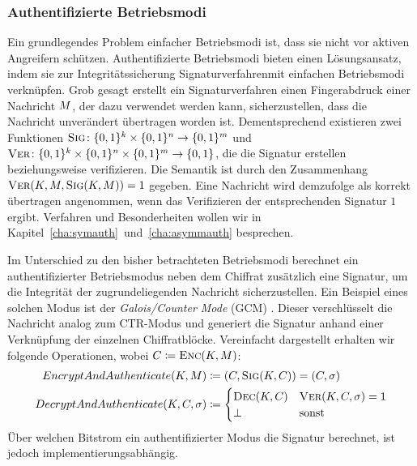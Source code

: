 \subsubsection{Authentifizierte Betriebsmodi}\label{sssec:gcm} 
Ein grundlegendes Problem einfacher Betriebsmodi ist, dass sie nicht vor
aktiven Angreifern schützen. Authentifizierte
Betriebsmodi bieten
einen Lösungsansatz, indem sie zur Integritätssicherung
Signaturverfahren\indexSig mit einfachen Betriebsmodi verknüpfen. 
 Grob gesagt erstellt ein Signaturverfahren einen Fingerabdruck einer
Nachricht $M$, der dazu verwendet werden kann, sicherzustellen,
dass die Nachricht unverändert übertragen worden ist. Dementsprechend
existieren zwei Funktionen $\textsc{Sig} \colon \{0,1\}^k \times \{0,1\}^n
\rightarrow \{0,1\}^m$ und $\textsc{Ver} \colon \{0,1\}^k \times \{0,1\}^n
\times \{0,1\}^m \rightarrow \{0,1\}$, die die Signatur erstellen
beziehungsweise verifizieren. Die Semantik ist durch den Zusammenhang
$\textsc{Ver}(K,M,\textsc{Sig}(K, M)) = 1$ gegeben. Eine Nachricht
wird demzufolge als korrekt übertragen angenommen, wenn das Verifizieren
der entsprechenden Signatur $1$ ergibt.
Verfahren und Besonderheiten wollen wir in
Kapitel~\ref{cha:symauth}~und~\ref{cha:asymmauth} besprechen. 

Im Unterschied zu den bisher betrachteten Betriebsmodi berechnet ein
authentifizierter Betriebsmodus neben dem Chiffrat zusätzlich eine
Signatur, um die Integrität der zugrundeliegenden Nachricht
sicherzustellen. Ein Beispiel eines solchen Modus ist der
\emph{Galois/Counter Mode} (GCM) \cite{NIST_GCM05}. Dieser verschlüsselt
die Nachricht analog zum CTR-Modus und generiert die Signatur anhand
einer Verknüpfung der einzelnen Chiffratblöcke. Vereinfacht dargestellt
erhalten wir folgende Operationen, wobei $C \coloneqq \textsc{Enc}(K,
M)$:
\begin{align*}
  EncryptAndAuthenticate(K, M) &\coloneqq (C, \textsc{Sig}(K, C)) = (C, \sigma)\\
  DecryptAndAuthenticate(K, C, \sigma) &\coloneqq \begin{cases}
    \textsc{Dec}(K, C) & \textsc{Ver}(K, C, \sigma) = 1 \\
    \bot & \textnormal{sonst}
  \end{cases}
\end{align*}
Über welchen Bitstrom ein authentifizierter Modus die Signatur berechnet,
ist jedoch implementierungsabhängig. 

